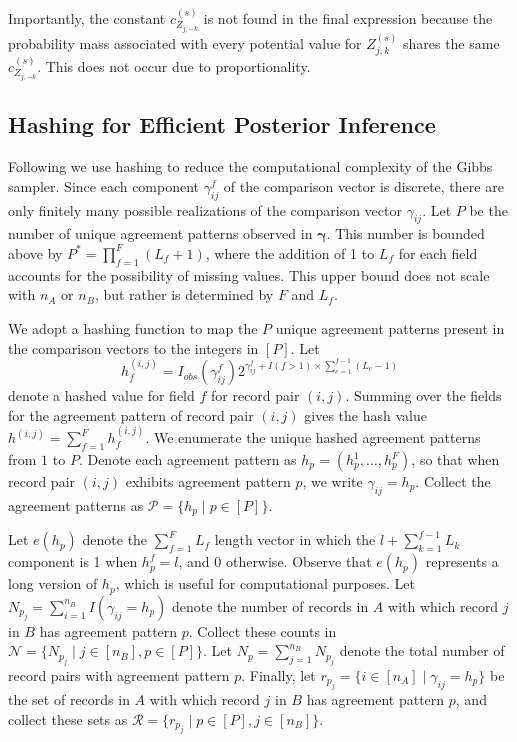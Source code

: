 \documentclass[12pt,letterpaper]{article}
\newcommand{\1}[1]{\mathbb{I}\!\left[#1\right]} %
\begin{document}
Importantly, the constant $c_{Z_{j, -k}}^{(s)}$ is not found in the final expression because the probability mass associated with every potential value for $Z_{j, k}^{(s)}$ shares the same $c_{Z_{j, -k}}^{(s)}$. This does not occur due to proportionality. 


\subsection{Hashing for Efficient Posterior Inference}\label{app:hashing}
Following \cite{kundinger_2023} we use hashing to reduce the computational complexity of the Gibbs sampler. Since each component $\gamma_{ij}^f$ of the comparison vector is discrete, there are only finitely many possible realizations of the comparison vector $\gamma_{ij}$. Let $P$ be the number of unique agreement patterns observed in $\bm{\gamma}$. This number is bounded above by $P^{*} =  \prod_{f=1}^F (L_f + 1)$, where the addition of 1 to $L_f$ for each field accounts for the possibility of missing values. This upper bound does not scale with $n_A$ or $n_B$, but rather is determined by $F$ and $L_f$.  

We adopt a hashing function to map the $P$ unique agreement patterns present in the comparison vectors to the integers in $[P]$. Let
\begin{equation*}
	h_f^{(i,j)} = I_{obs}( \gamma_{ij}^f) 2^{\gamma_{ij}^f + I(f>1) \times \sum_{e=1}^{f-1}(L_{e} - 1)}
\end{equation*}
denote a hashed value for field $f$ for record pair $(i,j)$. Summing over the fields for the agreement pattern of record pair $(i,j)$ gives the hash value $h^{(i,j)}=\sum_{f=1}^Fh_f^{(i,j)}$. We enumerate the unique hashed agreement patterns from $1$ to $P$. Denote each agreement pattern as $h_p=(h_p^1,\dots,h_p^F)$, so that when record pair $(i,j)$ exhibits agreement pattern $p$, we write $\gamma_{ij}=h_p$.  Collect the agreement patterns as $\mathcal{P}=\{h_p\mid p\in[P]\}$.

Let $e(h_p)$ denote the $\sum_{f=1}^FL_f$ length vector in which the $l + \sum_{k=1}^{f-1} L_k$ component is 1 when $h_p^f = l$, and 0 otherwise. Observe that $e(h_p)$ represents a long version of $h_p$, which is useful for computational purposes. Let $N_{p_j}=\sum_{i=1}^{n_B}I(\gamma_{ij}=h_p)$ denote the number of records in $A$ with which record $j$ in $B$ has agreement pattern $p$. Collect these counts in $\mathcal{N}=\{N_{p_j}\mid j\in[n_B], p\in[P]\}.$ Let $N_p=\sum_{j=1}^{n_B}N_{p_j}$ denote the total number of record pairs with agreement pattern $p$. Finally, let $r_{p_j}=\{i\in[n_A]\mid \gamma_{ij}=h_p\}$ be the set of records in $A$ with which record $j$ in $B$ has agreement pattern $p$, and collect these sets as $\mathcal{R}=\{r_{p_j}\mid p\in[P], j\in[n_B]\}$. 
\end{document}
